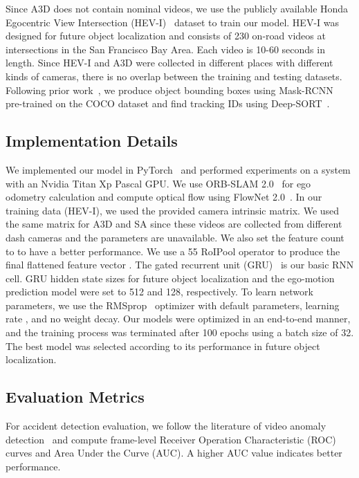 \documentclass[letterpaper, 10 pt, conference]{ieeeconf}
\theoremstyle{definition}
\theoremstyle{remark}
\begin{document}
Since A3D does not contain nominal videos, we use the publicly
available Honda Egocentric View Intersection
(HEV-I)~\cite{yao2018egocentric} dataset to train our model. HEV-I
was designed for future object localization and consists of 230
on-road videos at intersections in the San Francisco Bay Area. Each video 
is 10-60 seconds in length. Since HEV-I and A3D
were collected in different places with different kinds of cameras,
there is no overlap between the training and testing datasets.
Following prior work~\cite{yao2018egocentric}, we produce object
bounding boxes using Mask-RCNN~\cite{he2017mask} pre-trained on the
COCO dataset and find tracking IDs using
Deep-SORT~\cite{wojke2017simple}.

\subsection{Implementation Details}
We implemented our model in PyTorch~\cite{pytorch} and performed experiments 
on a system with an Nvidia Titan Xp Pascal
GPU. We use ORB-SLAM 2.0~\cite{mur2017orb} for ego
odometry calculation and compute optical flow using FlowNet
2.0~\cite{ilg2017flownet}. In our training data (HEV-I), 
we used the provided camera intrinsic matrix. We used the same matrix 
for A3D and SA
since these videos are collected from different dash cameras and the 
parameters are unavailable. We also set the feature count to  to 
have a better performance.
We use a 55 RoIPool operator to
produce the final flattened feature vector . The gated recurrent unit
(GRU)~\cite{chung2015gated} is our basic RNN cell. GRU hidden state sizes 
for future object localization  and the ego-motion prediction model were
set to 512 and 128, respectively. To learn network parameters, we
use the RMSprop~\cite{hinton2012neural} optimizer with default
parameters, learning rate , and no weight decay. Our models
were optimized in an end-to-end manner, and the training process was
terminated after 100 epochs using a batch size of 32. The best model
was selected according to its performance in future object localization.

\subsection{Evaluation Metrics}

For accident detection evaluation, we follow the literature of video anomaly 
detection~\cite{li2014anomaly}
and compute frame-level Receiver Operation Characteristic (ROC) curves and Area
Under the Curve (AUC). A higher AUC value indicates better
performance.
\end{document}
